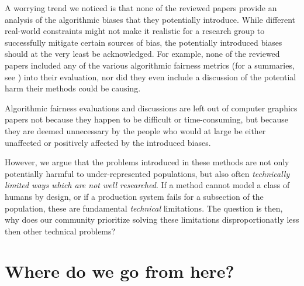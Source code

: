 \documentclass[nonacm,sigconf,review,balance=false]{acmart}
\begin{document}

A worrying trend we noticed is that none of the reviewed papers provide an analysis of the algorithmic biases that they potentially introduce. While different real-world constraints might not make it realistic for a research group to successfully mitigate certain sources of bias, the potentially introduced biases should at the very least be acknowledged. For example, none of the reviewed papers included any of the various algorithmic fairness metrics (for a summaries, see \cite{fairnesssurvey, fairnessmetrics}) into their evaluation, nor did they even include a discussion of the potential harm their methods could be causing.

Algorithmic fairness evaluations and discussions are left out of computer graphics papers not because they happen to be difficult or time-consuming, but because they are deemed unnecessary by the people who would at large be either unaffected or positively affected by the introduced biases.

However, we argue that the problems introduced in these methods are not only potentially harmful to under-represented populations, but also often \emph{technically limited ways which are not well researched}. If a method cannot model a class of humans by design, or if a production system fails for a subsection of the population, these are fundamental \emph{technical} limitations. The question is then, why does our community prioritize solving these limitations disproportionatly less then other technical problems?


\section{Where do we go from here?}

\end{document}
